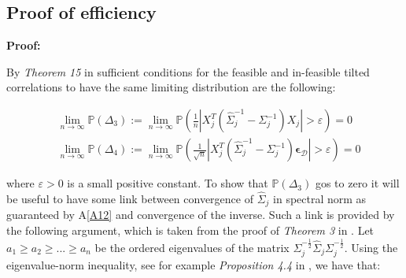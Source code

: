 \documentclass[11pt]{report}\usepackage[utf8]{inputenc}
\newtheorem{theorem}{Theorem}
\begin{document}
\subsection{Proof of efficiency} \label{efficiency proof}

\bigskip


\bigskip

\textbf{Proof:}

By \textit{Theorem 15} in \cite{schmidt_1976} sufficient conditions for the feasible and in-feasible tilted correlations to have the same limiting distribution are the following:

\begin{align*}
    & \lim_{n \rightarrow \infty}\mathbb{P}\left ( \Delta_3 \right ) := \lim_{n \rightarrow  \infty}\mathbb{P}\left ( \frac{1}{n}\left | X_j^T\left ( \widehat{\Sigma }_j^{-1} - \Sigma_j^{-1} \right )X_j  \right | > \varepsilon \right ) = 0 \\
    & \lim_{n \rightarrow  \infty}\mathbb{P}\left ( \Delta_4 \right ) :=  \lim_{n \rightarrow \infty}\mathbb{P}\left ( \frac{1}{\sqrt{n}}\left | X_j^T\left ( \widehat{\Sigma }_j^{-1} - \Sigma_j^{-1} \right )\boldsymbol{\epsilon}_\mathcal{D}  \right | > \varepsilon \right ) = 0 
\end{align*}
 
\bigskip
 
where $\varepsilon>0$ is a small positive constant. To show that $\mathbb{P}(\Delta_3)$ gos to zero it will be useful to have some link between convergence of $\widehat{\Sigma}_j$ in spectral norm as guaranteed by A\ref{A12} and convergence of the inverse. Such a link is provided by the following argument, which is taken from the proof of \textit{Theorem 3} in \cite{yousuf2018variable}. Let $a_1 \geq a_2 \geq ... \geq a_n $ be the ordered eigenvalues of the matrix $\Sigma_j^{-\frac{1}{2}}\widehat{\Sigma}_j\Sigma_j^{-\frac{1}{2}}$. Using the eigenvalue-norm inequality, see for example \textit{Proposition 4.4} in \cite{gallier}, we have that: 
\end{document}
